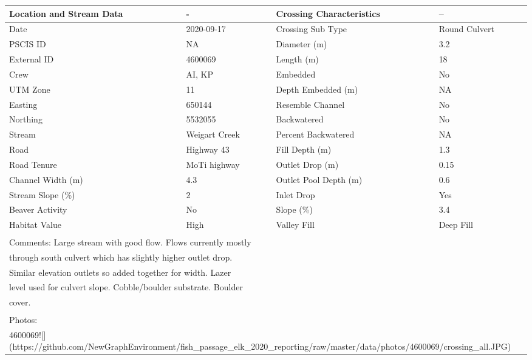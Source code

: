 \documentclass[
]{book}
\begin{document}
\begin{tabular}{l|l|l|l}
\hline
Location and Stream Data & - & Crossing Characteristics & --\\
\hline
Date & 2020-09-17 & Crossing Sub Type & Round Culvert\\
\hline
PSCIS ID & NA & Diameter (m) & 3.2\\
\hline
External ID & 4600069 & Length (m) & 18\\
\hline
Crew & AI, KP & Embedded & No\\
\hline
UTM Zone & 11 & Depth Embedded (m) & NA\\
\hline
Easting & 650144 & Resemble Channel & No\\
\hline
Northing & 5532055 & Backwatered & No\\
\hline
Stream & Weigart Creek & Percent Backwatered & NA\\
\hline
Road & Highway 43 & Fill Depth (m) & 1.3\\
\hline
Road Tenure & MoTi highway & Outlet Drop (m) & 0.15\\
\hline
Channel Width (m) & 4.3 & Outlet Pool Depth (m) & 0.6\\
\hline
Stream Slope (\%) & 2 & Inlet Drop & Yes\\
\hline
Beaver Activity & No & Slope (\%) & 3.4\\
\hline
Habitat Value & High & Valley Fill & Deep Fill\\
\hline
\multicolumn{4}{l}{\textsuperscript{} Comments: Large stream with good flow. Flows currently mostly}\\
\multicolumn{4}{l}{through south culvert which has slightly higher outlet drop.}\\
\multicolumn{4}{l}{Similar elevation outlets so added together for width. Lazer}\\
\multicolumn{4}{l}{level used for culvert slope. Cobble/boulder substrate. Boulder}\\
\multicolumn{4}{l}{cover.}\\
\multicolumn{4}{l}{\textsuperscript{} Photos:}\\
\multicolumn{4}{l}{4600069![](https://github.com/NewGraphEnvironment/fish\_passage\_elk\_2020\_reporting/raw/master/data/photos/4600069/crossing\_all.JPG)}\\
\end{tabular}
\end{document}
